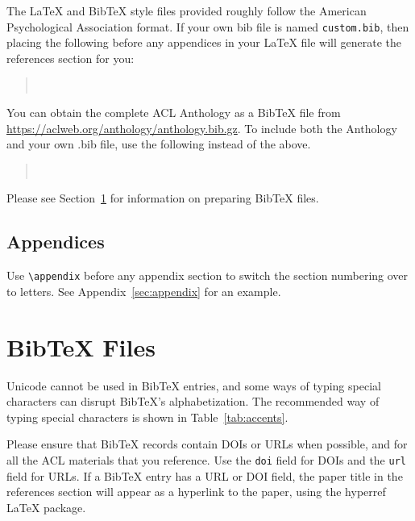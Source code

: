 \documentclass[11pt]{article}
\begin{document}
\nocite{Ando2005,borschinger-johnson-2011-particle,andrew2007scalable,rasooli-tetrault-2015,goodman-etal-2016-noise,harper-2014-learning}

The \LaTeX{} and Bib\TeX{} style files provided roughly follow the American Psychological Association format.
If your own bib file is named \texttt{custom.bib}, then placing the following before any appendices in your \LaTeX{} file will generate the references section for you:
\begin{quote}
\begin{verbatim}


\end{verbatim}
\end{quote}

You can obtain the complete ACL Anthology as a Bib\TeX{} file from \url{https://aclweb.org/anthology/anthology.bib.gz}.
To include both the Anthology and your own .bib file, use the following instead of the above.
\begin{quote}
\begin{verbatim}


\end{verbatim}
\end{quote}

Please see Section~\ref{sec:bibtex} for information on preparing Bib\TeX{} files.

\subsection{Appendices}

Use \verb|\appendix| before any appendix section to switch the section numbering over to letters. See Appendix~\ref{sec:appendix} for an example.

\section{Bib\TeX{} Files}
\label{sec:bibtex}

Unicode cannot be used in Bib\TeX{} entries, and some ways of typing special characters can disrupt Bib\TeX's alphabetization. The recommended way of typing special characters is shown in Table~\ref{tab:accents}.

Please ensure that Bib\TeX{} records contain DOIs or URLs when possible, and for all the ACL materials that you reference.
Use the \verb|doi| field for DOIs and the \verb|url| field for URLs.
If a Bib\TeX{} entry has a URL or DOI field, the paper title in the references section will appear as a hyperlink to the paper, using the hyperref \LaTeX{} package.
\end{document}
